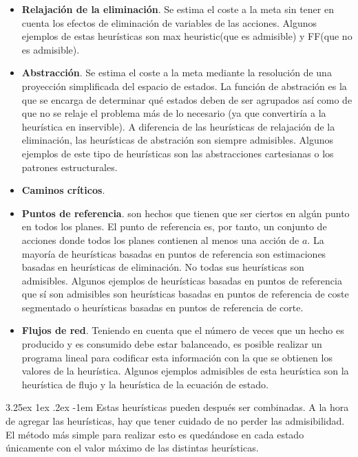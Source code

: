 \documentclass{article}
\makeatletter
\newcommand{\comment}[1]{}
\renewcommand\paragraph{\@startsection{paragraph}{5}{\z@}%
  {3.25ex \@plus1ex \@minus.2ex}%
  {-1em}%
  {\normalfont\normalsize\bfseries}}
\makeatother
\begin{document}
\begin{itemize}
    \item \textbf{Relajación de la eliminación}. Se estima el coste a la meta sin tener en cuenta los efectos de eliminación de variables de las acciones. Algunos ejemplos de estas heurísticas son max heuristic\comment{Buscar cita max heuristic}(que es admisible) y FF\cite{FF}(que no es admisible).
    \item \textbf{Abstracción}. Se estima el coste a la meta mediante la resolución de una proyección simplificada del espacio de estados. La función de abstración es la que se encarga de determinar qué estados deben de ser agrupados así como de que no se relaje el problema más de lo necesario (ya que convertiría a la heurística en inservible). A diferencia de las heurísticas de relajación de la eliminación, las heurísticas de abstración son siempre admisibles. Algunos ejemplos de este tipo de heurísticas son las abstracciones cartesianas o los patrones estructurales.\comment{Añadir las dos citas}
    \item \textbf{Caminos críticos}. \comment{TODO}
    \item \textbf{Puntos de referencia}. son hechos que tienen que ser ciertos en algún punto en todos los planes. El punto de referencia es, por tanto, un conjunto de acciones donde todos los planes contienen al menos una acción de $a$. La mayoría de heurísticas basadas en puntos de referencia son estimaciones basadas en heurísticas de eliminación. No todas sus heurísticas son admisibles. Algunos ejemplos de heurísticas basadas en puntos de referencia que sí son admisibles son heurísticas basadas en puntos de referencia de coste segmentado o heurísticas basadas en puntos de referencia de corte.\comment{add citation}
    \item \textbf{Flujos de red}. Teniendo en cuenta que el número de veces que un hecho es producido y es consumido debe estar balanceado, es posible realizar un programa lineal para codificar esta información con la que se obtienen los valores de la heurística.\comment{Are they all admissible?} Algunos ejemplos admisibles de esta heurística son la heurística de flujo y la heurística de la ecuación de estado.\comment{Add citations}

\end{itemize}

\paragraph{}
Estas heurísticas pueden después ser combinadas. A la hora de agregar las heurísticas, hay que tener cuidado de no perder las admisibilidad. El método más simple para realizar esto es quedándose en cada estado únicamente con el valor máximo de las distintas heurísticas.
\end{document}
